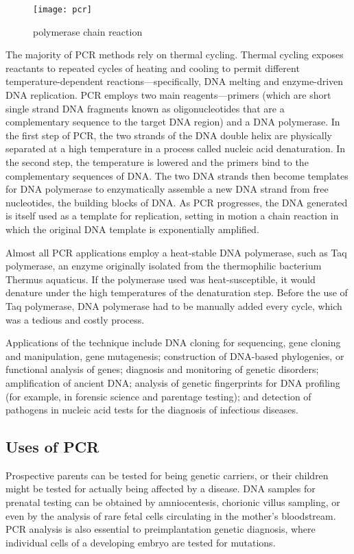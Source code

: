 \documentclass[12pt]{article}
\begin{document}
\begin{figure}[h]
   \centering
   \texttt{[image: pcr]}
   \caption{polymerase chain reaction}
   \label{fig_pcr}
\end{figure}


The majority of PCR methods rely on thermal cycling. Thermal cycling exposes reactants to repeated cycles of heating and cooling to permit different temperature-dependent reactions—specifically, DNA melting and enzyme-driven DNA replication. PCR employs two main reagents—primers (which are short single strand DNA fragments known as oligonucleotides that are a complementary sequence to the target DNA region) and a DNA polymerase. In the first step of PCR, the two strands of the DNA double helix are physically separated at a high temperature in a process called nucleic acid denaturation. In the second step, the temperature is lowered and the primers bind to the complementary sequences of DNA. The two DNA strands then become templates for DNA polymerase to enzymatically assemble a new DNA strand from free nucleotides, the building blocks of DNA. As PCR progresses, the DNA generated is itself used as a template for replication, setting in motion a chain reaction in which the original DNA template is exponentially amplified.


Almost all PCR applications employ a heat-stable DNA polymerase, such as Taq polymerase, an enzyme originally isolated from the thermophilic bacterium Thermus aquaticus. If the polymerase used was heat-susceptible, it would denature under the high temperatures of the denaturation step. Before the use of Taq polymerase, DNA polymerase had to be manually added every cycle, which was a tedious and costly process.


Applications of the technique include DNA cloning for sequencing, gene cloning and manipulation, gene mutagenesis; construction of DNA-based phylogenies, or functional analysis of genes; diagnosis and monitoring of genetic disorders; amplification of ancient DNA; analysis of genetic fingerprints for DNA profiling (for example, in forensic science and parentage testing); and detection of pathogens in nucleic acid tests for the diagnosis of infectious diseases.



\subsection{Uses of PCR}
Prospective parents can be tested for being genetic carriers, or their children might be tested for actually being affected by a disease. DNA samples for prenatal testing can be obtained by amniocentesis, chorionic villus sampling, or even by the analysis of rare fetal cells circulating in the mother's bloodstream. PCR analysis is also essential to preimplantation genetic diagnosis, where individual cells of a developing embryo are tested for mutations.
\end{document}
